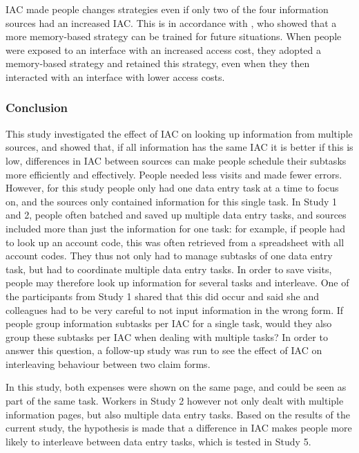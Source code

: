 
IAC made people changes strategies even if only two of the four information sources had an increased IAC. This is in accordance with \citep{Morgan2014}, who showed that a more memory-based strategy can be trained for future situations. When people were exposed to an interface with an increased access cost, they adopted a memory-based strategy and retained this strategy, even when they then interacted with an interface with lower access costs.


\subsubsection{Conclusion}
This study investigated the effect of IAC on looking up information from multiple sources, and showed that, if all information has the same IAC it is better if this is low, differences in IAC between sources can make people schedule their subtasks more efficiently and effectively. People needed less visits and made fewer errors. 
However, for this study people only had one data entry task at a time to focus on, and the sources only contained information for this single task. In Study 1 and 2, people often batched and saved up multiple data entry tasks, and sources included more than just the information for one task: for example, if people had to look up an account code, this was often retrieved from a spreadsheet with all account codes. They thus not only had to manage subtasks of one data entry task, but had to coordinate multiple data entry tasks. In order to save visits, people may therefore look up information for several tasks and interleave. One of the participants from Study 1 shared that this did occur and said she and colleagues had to be very careful to not input information in the wrong form. If people group information subtasks per IAC for a single task, would they also group these subtasks per IAC when dealing with multiple tasks? In order to answer this question, a follow-up study was run to see the effect of IAC on interleaving behaviour between two claim forms. 


In this study, both expenses were shown on the same page, and could be seen as part of the same task. Workers in Study 2 however not only dealt with multiple information pages, but also multiple data entry tasks. Based on the results of the current study, the hypothesis is made that a difference in IAC makes people more likely to interleave between data entry tasks, which is tested in Study 5.

